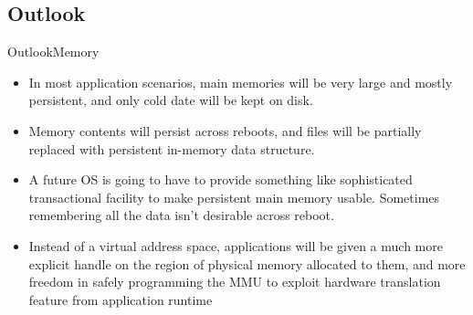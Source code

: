 \documentclass[10pt]{beamer}
\begin{document}
\subsection{Outlook}
\begin{frame}{Outlook}{Memory}
  \begin{itemize}
    \item In most application scenarios, main memories will be very large and
          mostly persistent, and only cold date will be kept on disk.
    \item Memory contents will persist across reboots, and files will be
          partially replaced with persistent in-memory data structure.
    \item A future OS is going to have to provide something like sophisticated
          transactional facility to make persistent main memory usable.
          Sometimes remembering all the data isn't desirable across reboot.
    \item Instead of a virtual address space, applications will be given a much
          more explicit handle on the region of physical memory allocated to
          them, and more freedom in safely programming the MMU to exploit
          hardware translation feature from application runtime
  \end{itemize}
\end{frame}

{\1
\begin{frame}
\end{frame}}
\end{document}
